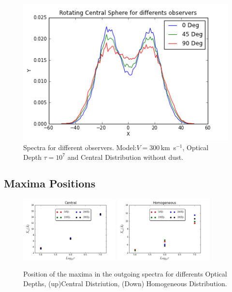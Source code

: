 \documentclass[usenatbib]{mn2e}
\newcommand{\kms}{\,km~s$^{-1}$}
\begin{document}
\begin{figure}
\begin{center}
\includegraphics[scale=0.45]{Observers.png}
\end{center}
\caption{Spectra for different observers. Model:$V=300$\kms, Optical
  Depth $\tau=10^{7}$ and Central Distribution without dust.} 
  \label{fig:DifferentObservers}
\end{figure}


\subsection{Maxima Positions}
\label{sec:MP}

\begin{figure}
    \includegraphics[width=0.45\textwidth]{maximumvsODDifSpeedsCentral.png}
    \includegraphics[width=0.45\textwidth]{maximumvsODDifSpeedsHOM.png}
  \label{figure:maximavsOD}\caption{Position of the maxima in the outgoing spectra for differents Optical Depths, (up)Central Distriution, (Down) Homogeneous Distribution.}
\end{figure}
\end{document}
